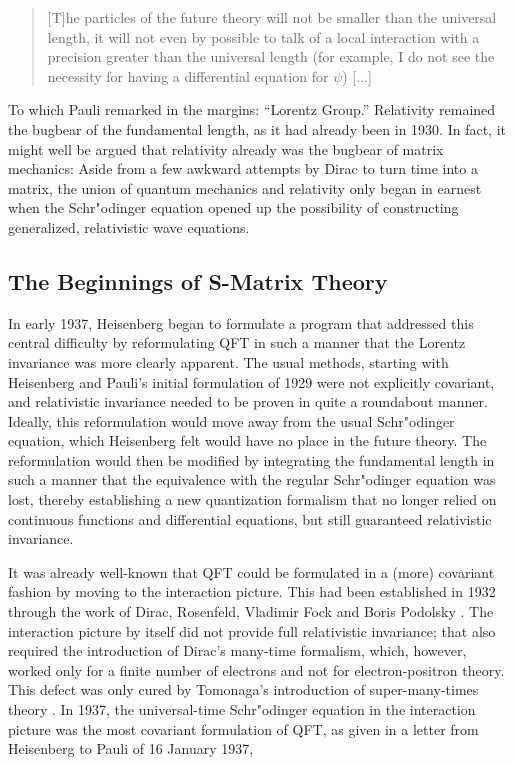 \documentclass[12pt,a4paper]{article}
\begin{document}
\begin{quote}
[T]he particles of the future theory will not be smaller than the universal length, it will not even by possible to talk of a local interaction with a precision greater than the universal length (for example, I do not see the necessity for having a differential equation for $\psi$) [...]
\end{quote}

To which Pauli remarked in the margins: ``Lorentz Group.'' Relativity remained the bugbear of the fundamental length, as it had already been in 1930. In fact, it might well be argued that relativity already was the bugbear of matrix mechanics: Aside from a few awkward attempts by Dirac to turn time into a matrix, the union of quantum mechanics and relativity only began in earnest when the Schr"odinger equation opened up the possibility of constructing generalized, relativistic wave equations.


\subsection{The Beginnings of S-Matrix Theory}

In early 1937, Heisenberg began to formulate a program that addressed this central difficulty by reformulating QFT in such a manner that the Lorentz invariance was more clearly apparent. The usual methods, starting with Heisenberg and Pauli's initial formulation of 1929 were not explicitly covariant, and relativistic invariance needed to be proven in quite a roundabout manner. Ideally, this reformulation would move away from the usual Schr"odinger equation, which Heisenberg felt would have no place in the future theory. The reformulation would then be modified by integrating the fundamental length in such a manner that the equivalence with the regular Schr"odinger equation was lost, thereby establishing a new quantization formalism that no longer relied on continuous functions and differential equations, but still guaranteed relativistic invariance.

It was already well-known that QFT could be formulated in a (more) covariant fashion by moving to the interaction picture. This had been established in 1932 through the work of Dirac, Rosenfeld, Vladimir Fock and Boris Podolsky \citep{dirac_1932_relativistic, rosenfeld_1932_uber-eine-mogliche, dirac_1932_on-quantum}. The interaction picture by itself did not provide full relativistic invariance; that also required the introduction of Dirac's many-time formalism, which, however, worked only for a finite number of electrons and not for electron-positron theory. This defect was only cured by Tomonaga's introduction of super-many-times theory \citep{tomonaga_1946_on-a-relativistically}. In 1937, the universal-time Schr"odinger equation in the interaction picture was the most covariant formulation of QFT, as given in a letter from Heisenberg to Pauli of 16 January 1937,
\end{document}
